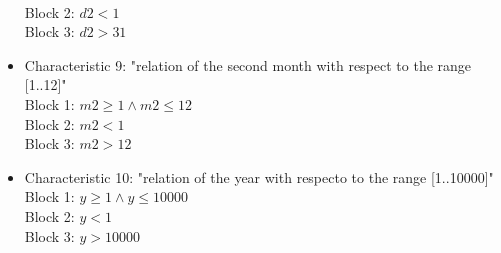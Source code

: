 \documentclass[12pt,a4paper]{article}
\begin{document}
\begin{itemize}
\\Block 2: $d2 < 1$
\\Block 3: $d2 > 31$
\item Characteristic 9: "relation of the second month with respect to the range [1..12]"
\\Block 1: $m2 \geq 1 \land m2 \leq 12$
\\Block 2: $m2 < 1$
\\Block 3: $m2 > 12$
\item Characteristic 10: "relation of the year with respecto to the range [1..10000]"
\\Block 1: $y \geq 1 \land y \leq 10000$
\\Block 2: $y < 1$
\\Block 3: $y > 10000$
\end{itemize}
\end{document}
